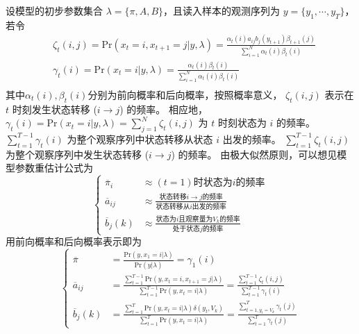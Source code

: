设模型的初步参数集合 $\lambda=\{ \pi, A, B
\}$，且读入样本的观测序列为 $y=\{ y_{1}, \cdots, y_{T} \}$，若令
$$
\begin{aligned}
  &\zeta_{t}(i,j)=\mbox{Pr}(x_{t}=i,x_{t+1}=j | y,\lambda)
    =\frac{\alpha_{t}(i)a_{ij} b_{j}(y_{t+1})\beta_{t+1}(j)}
    {\sum\limits_{i=1}^{N}\alpha_{t}(i)\beta_{t}(i)}\\
  &\gamma_{t}(i)=\mbox{Pr}(x_{t}=i | y,\lambda)
   =\frac{\alpha_{t}(i)\beta_{t}(i)}
   {\sum\limits_{i=1}^{N}\alpha_{t}(i)\beta_{t}(i)}\\
\end{aligned}
$$
其中$\alpha_{t}(i),
\beta_{t}(i)$分别为前向概率和后向概率，按照概率意义，
$\zeta_{t}(i,j)$ 表示在 $t$  时刻发生状态转移 ($i \rightarrow j$)
的频率。 相应地，$\gamma_{t}(i)=\mbox{Pr}(x_{t}=i |
y,\lambda)=\sum\limits_{j=1}^{N}\zeta_{t}(i,j)$ 为 $t$ 时刻状态为
$i$  的频率。
 $\sum\limits_{t=1}^{T-1}\gamma_{t}(i)$
为整个观察序列中状态转移从状态 $i$  出发的频率。
$\sum\limits_{t=1}^{T-1}\zeta_{t}(i,j)$ 为整个观察序列中发生状态转移
($i \rightarrow j$)  的频率。
由极大似然原则，可以想见模型参数重估计公式为
 $$
  \left\{
  \begin{array}{ll}
     \overline{\pi}_{i}&\approx(t=1)\mbox{时状态为}i\mbox{的频率}\\
     \overline{a}_{ij}&\approx\frac{\mbox{状态转移}i\rightarrow j\mbox{的频率}}
          {\mbox{状态转移从}i\mbox{出发的频率}}\\
   \overline{b}_{j}(k)&\approx\frac
           {\mbox{状态为}i\mbox{且观察量为}V_{k}\mbox{的频率}}
            {\mbox{处于状态}j\mbox{的频率}}
        \end{array}
  \right.
$$
用前向概率和后向概率表示即为
$$
\left\{
 \begin{array}{ll}
   \overline{\pi}& =\frac{\mbox{Pr}(y,x_{1}=i | \lambda)}
               {\mbox{Pr}(y | \lambda)}
       =\gamma_{1}(i)\\
   \overline{a}_{ij}
       &=\frac{\sum\limits_{t=1}^{T-1}
          \mbox{Pr}(y,x_{t}=i,x_{t+1}=j | \lambda)}
          {\sum\limits_{t=1}^{T-1}
           \mbox{Pr}(y,x_{t}=i | \lambda)}
          =\frac{\sum\limits_{t=1}^{T-1}\zeta_{t}(i,j)}
          {\sum\limits_{t=1}^{T-1}\gamma_{t}(i)}\\
     \overline{b}_{j}(k)
       &=\frac{\sum\limits_{t=1}^{T}
        \mbox{Pr}(y,x_{t}=i | \lambda) \delta(y_{t},V_{k})}
         {\sum\limits_{t=1}^{T}\mbox{Pr}(y,x_{t}=i | \lambda)}
         =\frac{\sum\limits_{t=1,y_{t}=V_{k}}^{T} \gamma_{t}(j)}
        {\sum\limits_{t=1}^{T}\gamma_{t}(j)}
  \end{array}
\right.
$$

